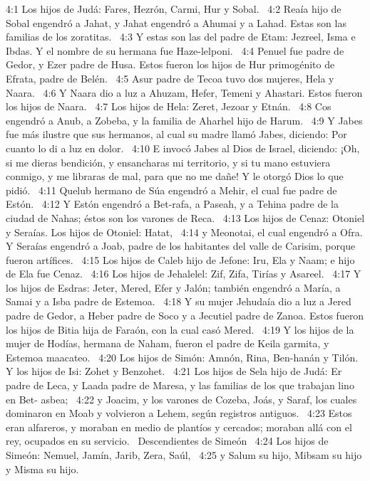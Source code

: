 4:1 Los hijos de Judá: Fares, Hezrón, Carmi, Hur y Sobal.  
4:2 Reaía hijo de Sobal engendró a Jahat, y Jahat engendró a Ahumai y a Lahad. Estas son las familias de los zoratitas.  
4:3 Y estas son las del padre de Etam: Jezreel, Isma e Ibdas. Y el nombre de su hermana fue Haze-lelponi.  
4:4 Penuel fue padre de Gedor, y Ezer padre de Husa. Estos fueron los hijos de Hur primogénito de Efrata, padre de Belén.  
4:5 Asur padre de Tecoa tuvo dos mujeres, Hela y Naara.  
4:6 Y Naara dio a luz a Ahuzam, Hefer, Temeni y Ahastari. Estos fueron los hijos de Naara.  
4:7 Los hijos de Hela: Zeret, Jezoar y Etnán.  
4:8 Cos engendró a Anub, a Zobeba, y la familia de Aharhel hijo de Harum.  
4:9 Y Jabes fue más ilustre que sus hermanos, al cual su madre llamó Jabes, diciendo: Por cuanto lo di a luz en dolor.  
4:10 E invocó Jabes al Dios de Israel, diciendo: ¡Oh, si me dieras bendición, y ensancharas mi territorio, y si tu mano estuviera conmigo, y me libraras de mal, para que no me dañe! Y le otorgó Dios lo que pidió.  
4:11 Quelub hermano de Súa engendró a Mehir, el cual fue padre de Estón.  
4:12 Y Estón engendró a Bet-rafa, a Paseah, y a Tehina padre de la ciudad de Nahas; éstos son los varones de Reca.  
4:13 Los hijos de Cenaz: Otoniel y Seraías. Los hijos de Otoniel: Hatat,  
4:14 y Meonotai, el cual engendró a Ofra. Y Seraías engendró a Joab, padre de los habitantes del valle de Carisim, porque fueron artífices.  
4:15 Los hijos de Caleb hijo de Jefone: Iru, Ela y Naam; e hijo de Ela fue Cenaz.  
4:16 Los hijos de Jehalelel: Zif, Zifa, Tirías y Asareel.  
4:17 Y los hijos de Esdras: Jeter, Mered, Efer y Jalón; también engendró a María, a Samai y a Isba padre de Estemoa.  
4:18 Y su mujer Jehudaía dio a luz a Jered padre de Gedor, a Heber padre de Soco y a Jecutiel padre de Zanoa. Estos fueron los hijos de Bitia hija de Faraón, con la cual casó Mered.  
4:19 Y los hijos de la mujer de Hodías, hermana de Naham, fueron el padre de Keila garmita, y Estemoa maacateo.  
4:20 Los hijos de Simón: Amnón, Rina, Ben-hanán y Tilón. Y los hijos de Isi: Zohet y Benzohet.  
4:21 Los hijos de Sela hijo de Judá: Er padre de Leca, y Laada padre de Maresa, y las familias de los que trabajan lino en Bet- asbea;  
4:22 y Joacim, y los varones de Cozeba, Joás, y Saraf, los cuales dominaron en Moab y volvieron a Lehem, según registros antiguos.  
4:23 Estos eran alfareros, y moraban en medio de plantíos y cercados; moraban allá con el rey, ocupados en su servicio.  
Descendientes de Simeón  
4:24 Los hijos de Simeón: Nemuel, Jamín, Jarib, Zera, Saúl,  
4:25 y Salum su hijo, Mibsam su hijo y Misma su hijo.  
